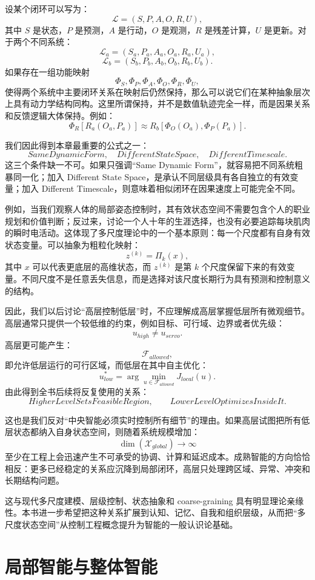 设某个闭环可以写为：
\[
\mathcal{L}
=
(S,P,A,O,R,U),
\]
其中 $S$ 是状态，$P$ 是预测，$A$ 是行动，$O$ 是观测，$R$ 是残差计算，$U$ 是更新。对于两个不同系统：
\[
\mathcal{L}_a
=
(S_a,P_a,A_a,O_a,R_a,U_a),
\]
\[
\mathcal{L}_b
=
(S_b,P_b,A_b,O_b,R_b,U_b).
\]
如果存在一组功能映射
\[
\Phi_S,\Phi_P,\Phi_A,\Phi_O,\Phi_R,\Phi_U,
\]
使得两个系统中主要闭环关系在映射后仍然保持，那么可以说它们在某种抽象层次上具有动力学结构同构。这里所谓保持，并不是数值轨迹完全一样，而是因果关系和反馈逻辑大体保持。例如：
\[
\Phi_R
\left[
R_a(O_a,P_a)
\right]
\approx
R_b
\left[
\Phi_O(O_a),
\Phi_P(P_a)
\right].
\]

我们因此得到本章最重要的公式之一：
\[
\boxed{
SameDynamicForm,
\quad
DifferentStateSpace,
\quad
DifferentTimescale.
}
\]
这三个条件缺一不可。如果只强调“Same Dynamic Form”，就容易把不同系统粗暴同一化；加入 Different State Space，是承认不同层级具有各自独立的有效变量；加入 Different Timescale，则意味着相似闭环在因果速度上可能完全不同。

例如，当我们观察人体的局部姿态控制时，其有效状态空间不需要包含个人的职业规划和价值判断；反过来，讨论一个人十年的生涯选择，也没有必要追踪每块肌肉的瞬时电活动。这体现了多尺度理论中的一个基本原则：每一个尺度都有自身有效状态变量。可以抽象为粗粒化映射：
\[
z^{(k)}
=
\Pi_k(x),
\]
其中 $x$ 可以代表更底层的高维状态，而 $z^{(k)}$ 是第 $k$ 个尺度保留下来的有效变量。不同尺度不是任意丢失信息，而是选择对该尺度长期行为具有预测和控制意义的结构。

因此，我们以后讨论“高层控制低层”时，不应理解成高层掌握低层所有微观细节。高层通常只提供一个较低维的约束，例如目标、可行域、边界或者优先级：
\[
u_{high}
\neq
u_{servo}.
\]
高层更可能产生：
\[
\mathcal{F}_{allowed},
\]
即允许低层运行的可行区域，而低层在其中自主优化：
\[
u_{low}^{*}
=
\arg\min_{u\in\mathcal{F}_{allowed}}
J_{local}(u).
\]
由此得到全书后续将反复使用的关系：
\[
\boxed{
HigherLevelSetsFeasibleRegion,
\qquad
LowerLevelOptimizesInsideIt.
}
\]

这也是我们反对“中央智能必须实时控制所有细节”的理由。如果高层试图把所有低层状态都纳入自身状态空间，则随着系统规模增加：
\[
\dim(\mathcal{X}_{global})
\rightarrow
\infty
\]
至少在工程上会迅速产生不可承受的协调、计算和延迟成本。成熟智能的方向恰恰相反：更多已经稳定的关系应沉降到局部闭环，高层只处理跨区域、异常、冲突和长期结构问题。

这与现代多尺度建模、层级控制、状态抽象和 coarse-graining 具有明显理论亲缘性。本书进一步希望把这种关系扩展到认知、记忆、自我和组织层级，从而把“多尺度状态空间”从控制工程概念提升为智能的一般认识论基础。

\section{局部智能与整体智能}

